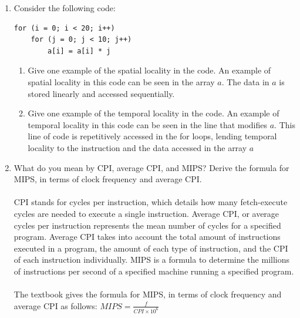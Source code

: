 \documentclass{article}
\begin{document}
\begin{enumerate}
    \pagebreak
    
    \raggedright
    \item Consider the following code:
    \begin{verbatim}
for (i = 0; i < 20; i++)
    for (j = 0; j < 10; j++)
        a[i] = a[i] * j
    \end{verbatim}
    \begin{enumerate}
        \item Give one example of the spatial locality in the code. 
        \newline An example of spatial locality in this code can be seen in the array $a$. 
        The data in $a$ is stored linearly and accessed sequentially.
        \item Give one example of the temporal locality in the code.
        \newline An example of temporal locality in this code can be seen in the line that modifies $a$.
        This line of code is repetitively accessed in the for loops, lending temporal locality to the instruction
        and the data accessed in the array $a$
    \end{enumerate}

    \item What do you mean by CPI, average CPI, and MIPS? Derive the formula for MIPS, in terms of clock frequency and average CPI.
    \paragraph{} CPI stands for cycles per instruction, which details how many fetch-execute cycles are needed to execute a single instruction. Average CPI, or average cycles per instruction represents the mean number of cycles for a specified program. Average CPI takes into account the total amount of instructions executed in a program, the amount of each type of instruction, and the CPI of each instruction individually. MIPS is a formula to determine the millions of instructions per second of a specified machine running a specified program.
    
    \paragraph{} The textbook gives the formula for MIPS, in terms of clock frequency and average CPI as follows:
    \( {MIPS} = \frac{f}{CPI \times 10^6}\)


\end{enumerate}
\end{document}
